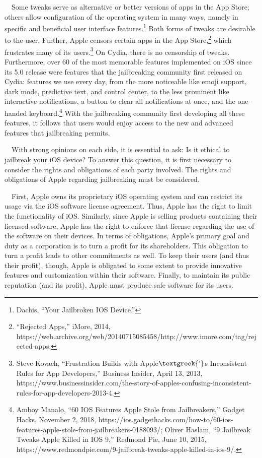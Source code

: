\documentclass{article}
\begin{document}
\ \ Some tweaks serve as alternative or better versions of apps in the App Store; others allow configuration of the
operating system in many ways, namely in specific and beneficial user interface features.\footnote{Dachis, “Your
Jailbroken IOS Device.”} Both forms of tweaks are desirable to the user. Further, Apple censors certain apps in the App
Store,\footnote{“Rejected Apps,” iMore, 2014,
https://web.archive.org/web/20140715085458/http://www.imore.com/tag/rejected-apps.} which frustrates many of its
users.\footnote{Steve Kovach, “Frustration Builds with Apple$\text{\textgreek{’}}$s Inconsistent Rules for App
Developers,” Business Insider, April 13, 2013,
https://www.businessinsider.com/the-story-of-apples-confusing-inconsistent-rules-for-app-developers-2013-4.} On Cydia,
there is no censorship of tweaks. Furthermore, over 60 of the most memorable features implemented on iOS since its 5.0
release were features that the jailbreaking community first released on Cydia: features we use every day, from the more
noticeable like emoji support, dark mode, predictive text, and control center, to the less prominent like interactive
notifications, a button to clear all notifications at once, and the one-handed keyboard.\footnote{Amboy Manalo, “60 IOS
Features Apple Stole from Jailbreakers,” Gadget Hacks, November 2, 2018,
https://ios.gadgethacks.com/how-to/60-ios-features-apple-stole-from-jailbreakers-0188093/; Oliver Haslam, “9 Jailbreak
Tweaks Apple Killed in IOS 9,” Redmond Pie, June 10, 2015,
https://www.redmondpie.com/9-jailbreak-tweaks-apple-killed-in-ios-9/.} With the jailbreaking community first developing
all these features, it follows that users would enjoy access to the new and advanced features that jailbreaking
permits.

\ \ With strong opinions on each side, it is essential to ask: Is it ethical to jailbreak your iOS device? To answer
this question, it is first necessary to consider the rights and obligations of each party involved. The rights and
obligations of Apple regarding jailbreaking must be considered.

\ \ First, Apple owns its proprietary iOS operating system and can restrict its usage via the iOS software license
agreement. Thus, Apple has the right to limit the functionality of iOS. Similarly, since Apple is selling products
containing their licensed software, Apple has the right to enforce that license regarding the use of the software on
their devices. In terms of obligations, Apple's primary goal and duty as a corporation is to turn a profit for its
shareholders. This obligation to turn a profit leads to other commitments as well. To keep their users (and thus their
profit), though, Apple is obligated to some extent to provide innovative features and customization within their
software. Finally, to maintain its public reputation (and its profit), Apple must produce safe software for its users.
\end{document}
